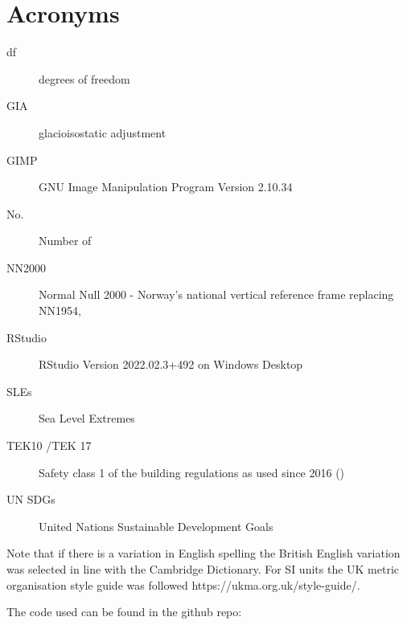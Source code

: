 
\chapter{Acronyms}
\begin{description}
\item[df]degrees of freedom
\item[GIA] glacioisostatic adjustment
\item[GIMP] GNU Image Manipulation Program Version 2.10.34
\item[No.] Number of
\item[NN2000] Normal Null 2000 - Norway's national vertical reference frame replacing NN1954, 
\item [RStudio] RStudio Version 2022.02.3+492 on Windows Desktop
\item[SLEs] Sea Level Extremes
\item[TEK10 /TEK 17] Safety class 1 of the building regulations as used since 2016 (\cite{tides_high_2022})
\item [UN SDGs] United Nations Sustainable Development Goals 
\end{description}

Note that if there is a variation in English spelling the British English variation was selected in line with the Cambridge Dictionary. For SI units the UK metric organisation style guide was followed https://ukma.org.uk/style-guide/.  

The code used can be found in the github repo: 